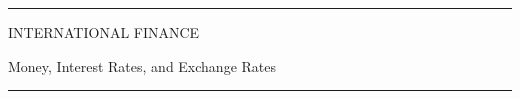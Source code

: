 \documentclass[12pt,aspectratio=169]{beamer}
\begin{document}
\begin{frame}

\begin{center}

\rule{\textwidth}{2pt}

\vskip3mm
INTERNATIONAL FINANCE

Money, Interest Rates, and Exchange Rates 
\rule{\textwidth}{2pt}

\end{center}

\end{frame}


\end{document}
